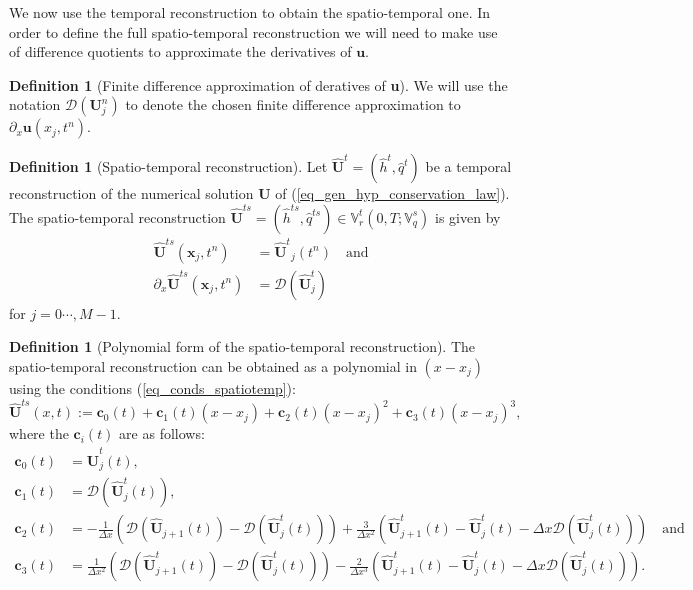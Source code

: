 \documentclass[12pt,a4paper]{article}
\numberwithin{equation}{section}
\theoremstyle{definition}
\newcommand{\FD}{\mathcal{D}}
\newcommand{\vect}[1]{\textbf{#1}}
\newcommand{\qp}[1]{\left(#1\right)}
\newcommand{\rec}[1]{\widehat{{#1}}}
\newcommand{\rects}[1]{\widehat{{\vect{#1}}}^{ts}}
\newtheorem{Defn}[subsection]{Definition}
\begin{document}
We now use the temporal reconstruction to obtain the spatio-temporal one.  In order to define the full spatio-temporal reconstruction we will need to make use of difference quotients to approximate the derivatives of $\vect{u}$.  
\begin{Defn}[Finite difference approximation of deratives of \vect{u}]
We will use the notation 
$\FD\qp{\vect{U}^n_j}$
to denote the chosen finite difference approximation to $\partial_x\vect{u}\qp{x_j,t^n}$.
\end{Defn}
\begin{Defn}[Spatio-temporal reconstruction]\label{defn_spatio-temporal reconstruction}
	Let $ \widehat{\textbf{U}}^t=\qp{\rec{h}^t,\rec{q}^t}$ be a temporal reconstruction of the numerical solution $\vect{U}$ of (\ref{eq_gen_hyp_conservation_law}).  The spatio-temporal reconstruction $\widehat{\textbf{U}}^{ts}=\qp{\rec{h}^{ts},\rec{q}^{ts}}\in\mathbb{V}^t_r\qp{0,T; \mathbb{V}^s_q}$ is given by
	\begin{equation}\label{eq_conds_spatiotemp}
	\begin{aligned}
	 \widehat{\vect {U}}^{ts}\qp{\vect x_j,t^n}&= 
	{ \widehat{\vect {U}}^t}_j\qp{t^n}\quad \text{and}\\
	\partial_{x}{ \widehat{\vect {U}}^{ts}\qp{\vect x_j,t^n}}&= 
	\FD{\qp{ \widehat{\vect {U}}^t_j  }}
	\end{aligned}
	\end{equation}
	for $  j=0\cdots,M-1$.  
\end{Defn}

\begin{Defn}[Polynomial form of the spatio-temporal reconstruction]\label{defn_spatio_temp_rec_shw}
	The spatio-temporal reconstruction can be obtained as a polynomial in $\qp{x-x_j}$  using the conditions (\ref{eq_conds_spatiotemp}):
	\begin{equation}
\rects{U}\qp{x,t}:=\vect{c}_0\qp{t} +\vect{c}_1\qp{t}\qp{x-x_j} +\vect{c}_2\qp{t}\qp{x-x_j}^2+\vect{c}_3\qp{t}\qp{x-x_j}^3,
	\end{equation}
where the $\vect{c}_i\qp{t}$ are as follows:
	\begin{equation}
	\begin{aligned}
	\vect{c}_{0}\qp{t} &= \rec{\vect{U}}^t_j\qp{t},\\
	\vect{c}_{1}\qp{t}&=\FD\qp{\rec{\vect{U}}^t_j\qp{t}},\\
	\vect{c}_{2}\qp{t}&=-\frac{1}{\Delta x}\qp{\FD\qp{\rec{\vect{U}}_{j+1}\qp{t}}-\FD\qp{\rec{\vect{U}}^t_j\qp{t}}}+
	\frac{3}{\Delta x^2}\qp{ \rec{\vect{U}}^t_{j+1}\qp{t}- \rec{\vect{U}}^t_j\qp{t}-\Delta x\FD\qp{\rec{\vect{U}}^t_{j}\qp{t}}}\quad \text{and}\\
	\vect{c}_{3}\qp{t}&=\frac{1}{\Delta x^2}\qp{\FD\qp{\rec{\vect{U}}^t_{j+1}\qp{t}}-\FD\qp{\rec{\vect{U}}^t_{j}\qp{t}}}
	-\frac{2}{\Delta x^3}\qp{\rec{\vect{U}}^t_{j+1}\qp{t}-\rec{\vect{U}}^t_j\qp{t}-\Delta x \FD\qp{\rec{\vect{U}}^t_j\qp{t}}}.\\
	\end{aligned}
	\end{equation}
\end{Defn}
\end{document}
